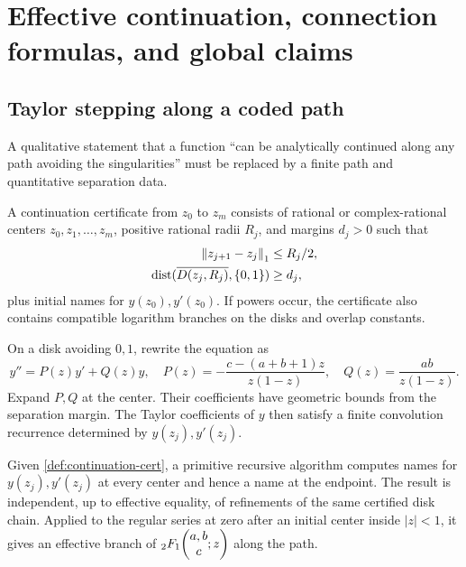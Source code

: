 \section{Effective continuation, connection formulas, and global claims}\label{sec:continuation}

\subsection{Taylor stepping along a coded path}

A qualitative statement that a function ``can be analytically continued along
any path avoiding the singularities'' must be replaced by a finite path and
quantitative separation data.

\begin{definition}\label{def:continuation-cert}
A continuation certificate from \(z_0\) to \(z_m\) consists of rational or
complex-rational centers
\(z_0,z_1,\ldots,z_m\), positive rational radii \(R_j\), and margins
\(d_j>0\) such that
\begin{align*}
 \left\lVert z_{j+1}-z_j\right\rVert_1&\le R_j/2,\\
 \operatorname{dist}(\overline{D(z_j,R_j)},\{0,1\})&\ge d_j,
\end{align*}
plus initial names for \(y(z_0),y'(z_0)\).  If powers occur, the certificate
also contains compatible logarithm branches on the disks and overlap
constants.
\end{definition}

On a disk avoiding \(0,1\), rewrite the equation as
\[
 y''=P(z)y'+Q(z)y,
 \quad
 P(z)=-\frac{c-(a+b+1)z}{z(1-z)},
 \quad
 Q(z)=\frac{ab}{z(1-z)}.
\]
Expand \(P,Q\) at the center.  Their coefficients have geometric bounds from
the separation margin.  The Taylor coefficients of \(y\) then satisfy a
finite convolution recurrence determined by \(y(z_j),y'(z_j)\).

\begin{theorem}\label{thm:path-continuation}
Given \cref{def:continuation-cert}, a primitive recursive algorithm computes
names for \(y(z_j),y'(z_j)\) at every center and hence a name at the endpoint.
The result is independent, up to effective equality, of refinements of the
same certified disk chain.  Applied to the regular series at zero after an
initial center inside \(|z|<1\), it gives an effective branch of
\({}_2F_1\!\left(\begin{matrix}a,b\\c\end{matrix};z\right)\) along the path.
\end{theorem}

